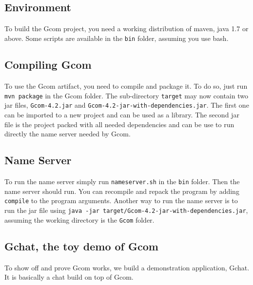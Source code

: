 \subsection{Environment}
\paragraph{}{
    To build the Gcom project, you need a working distribution of maven, java
 1.7 or above. Some scripts are available in the \texttt{bin} folder, assuming
 you use bash.
}


\subsection{Compiling Gcom}
\paragraph{}{
    To use the Gcom artifact, you need to compile and package it. To do so,
 just run \texttt{mvn package} in the Gcom folder. The sub-directory
 \texttt{target} may now contain two jar files, \texttt{Gcom-4.2.jar} and
 \texttt{Gcom-4.2-jar-with-dependencies.jar}. The first one can be imported
 to a new project and can be used as a library. The second jar file is the 
 project packed with all needed dependencies and can be use to run directly
 the name server needed by Gcom.
}

\subsection{Name Server}
\paragraph{}{
    To run the name server simply run \texttt{nameserver.sh} in the
 \texttt{bin} folder. Then the name server should run. You can recompile
 and repack the program by adding \texttt{compile} to the program
 arguments. Another way to run the name server is to run the jar file
 using \texttt{java -jar target/Gcom-4.2-jar-with-dependencies.jar},
 assuming the working directory is the \texttt{Gcom} folder.
}

\subsection{Gchat, the toy demo of Gcom}
\paragraph{}{
    To show off and prove Gcom works, we build a demonstration application,
 Gchat. It is basically a chat build on top of Gcom.
}

